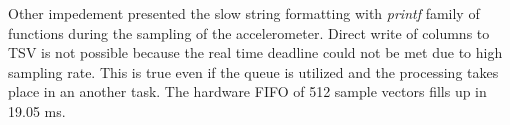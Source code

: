 Other impedement presented the slow string formatting with \emph{printf} family of functions during the sampling of the accelerometer. Direct write of columns to TSV is not possible because the real time deadline could not be met due to high sampling rate. This is true even if the queue is utilized and the processing takes place in an another task. The hardware FIFO of 512 sample vectors fills up in 19.05 ms.








